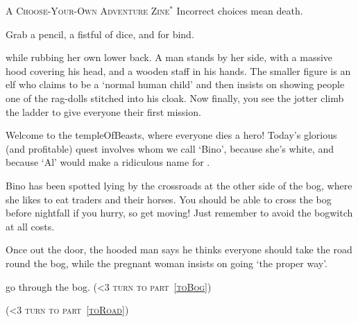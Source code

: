 \documentclass[10pt,twoside]{book}
\newenvironment{selectPath}%
  {%
    \begin{description}%
    \setlength\itemsep{.2em}
    \raggedright
  }%
  { \end{description} }
\newcommand\willYe[3]{%
  \item[#1]
  #2
  ({\scshape\ifnum\value{list}<3 turn to \fi part~\vref{#3}})
}
\begin{document}
\frontmatter
{}

\begin{center}
  
  \par
  \vspace{3\baselineskip}
  {\Large\scshape A Choose-Your-Own Adventure Zine$^{*}$}
  \vfill\null
  \ast\tiny Incorrect choices mean death.
\end{center}

\pagebreak

\small

\noindent
Grab a pencil, a fistful of dice, and  for \gls{bind}.

\clearpage
\setcounter{page}{1}
\pagestyle{plain}

while rubbing her own lower back.
A man stands by her side, with a massive hood covering his head, and a wooden staff in his hands.
The smaller figure is an elf who claims to be a `normal human child' and then insists on showing people one of the rag-dolls stitched into his cloak.
Now finally, you see the \gls{jotter} climb the ladder to give everyone their first mission.

\begin{speechtext}
  Welcome to the \gls{templeOfBeasts}, where everyone dies a hero!
  Today's glorious (and profitable) quest involves  whom we call `Bino', because she's white, and because `Al' would make a ridiculous name for .

  Bino has been spotted lying by the crossroads at the other side of the bog, where she likes to eat traders and their horses.
  You should be able to cross the bog before nightfall if you hurry, so get moving!
  Just remember to avoid the \gls{bogwitch} at all costs.
\end{speechtext}

Once out the door, the hooded man says he thinks everyone should take the road round the bog, while the pregnant woman insists on going `the proper way'.

\begin{selectPath}
  \willYe{Do as you're told,}%
  {go through the bog.}%
  {toBog}

  \willYe{Take the main road.}%
  {}%
  {toRoad}
\end{selectPath}
\end{document}
